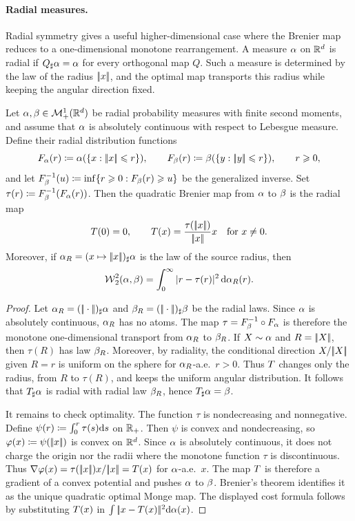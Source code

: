 \paragraph{Radial measures.}

Radial symmetry gives a useful higher-dimensional case where the Brenier map reduces to a one-dimensional monotone rearrangement. A measure $\alpha$ on $\mathbb{R}^d$ is radial if $Q_\sharp\alpha=\alpha$ for every orthogonal map $Q$. Such a measure is determined by the law of the radius $|\!| x |\!|$, and the optimal map transports this radius while keeping the angular direction fixed.

\begin{prop}\label{prop-radial-transport}
	Let $\alpha,\beta\in\mathcal{M}_+^1(\mathbb{R}^d)$ be radial probability measures with finite second moments, and assume that $\alpha$ is absolutely continuous with respect to Lebesgue measure. Define their radial distribution functions
	\[
		F_\alpha(r)\coloneqq \alpha(\{x:|\!| x |\!|\leqslant r\}),
		\qquad
		F_\beta(r)\coloneqq \beta(\{y:|\!| y |\!|\leqslant r\}),
		\qquad r\geqslant0,
	\]
	and let $F_\beta^{-1}(u)\coloneqq\inf\{r\geqslant0:F_\beta(r)\geqslant u\}$ be the generalized inverse.
	Set $\tau(r)\coloneqq F_\beta^{-1}(F_\alpha(r))$.
	Then the quadratic Brenier map from $\alpha$ to $\beta$ is the radial map
	\[
		T(0)=0,
		\qquad
		T(x)=\frac{\tau(|\!| x |\!|)}{|\!| x |\!|}x
		\quad\text{for }x\neq0.
	\]
	Moreover, if $\alpha_R=(x\mapsto|\!| x |\!|)_\sharp\alpha$ is the law of the source radius, then
	\[
		\operatorname{\mathcal{W}}_2^2(\alpha,\beta)
		=
		\int_0^\infty |r-\tau(r)|^2\,\mathrm{d}\alpha_R(r).
	\]
\end{prop}
\begin{proof}
	Let $\alpha_R=(|\!| \cdot |\!|)_\sharp\alpha$ and $\beta_R=(|\!| \cdot |\!|)_\sharp\beta$ be the radial laws. Since $\alpha$ is absolutely continuous, $\alpha_R$ has no atoms. The map $\tau=F_\beta^{-1}\circ F_\alpha$ is therefore the monotone one-dimensional transport from $\alpha_R$ to $\beta_R$. If $X\sim\alpha$ and $R=|\!| X |\!|$, then $\tau(R)$ has law $\beta_R$. Moreover, by radiality, the conditional direction $X/|\!| X |\!|$ given $R=r$ is uniform on the sphere for $\alpha_R$-a.e.\ $r>0$. Thus $T$ changes only the radius, from $R$ to $\tau(R)$, and keeps the uniform angular distribution. It follows that $T_\sharp\alpha$ is radial with radial law $\beta_R$, hence $T_\sharp\alpha=\beta$.

	It remains to check optimality. The function $\tau$ is nondecreasing and nonnegative. Define $\psi(r)\coloneqq\int_0^r\tau(s)\mathrm{d} s$ on $\mathbb{R}_+$. Then $\psi$ is convex and nondecreasing, so $\varphi(x)\coloneqq\psi(|\!| x |\!|)$ is convex on $\mathbb{R}^d$. Since $\alpha$ is absolutely continuous, it does not charge the origin nor the radii where the monotone function $\tau$ is discontinuous. Thus
	$\nabla\varphi(x)=\tau(|\!| x |\!|)x/|\!| x |\!|=T(x)$ for $\alpha$-a.e.\ $x$.
	The map $T$ is therefore a gradient of a convex potential and pushes $\alpha$ to $\beta$. Brenier's theorem identifies it as the unique quadratic optimal Monge map. The displayed cost formula follows by substituting $T(x)$ in $\int|\!| x-T(x) |\!|^2\mathrm{d}\alpha(x)$.
\end{proof}


